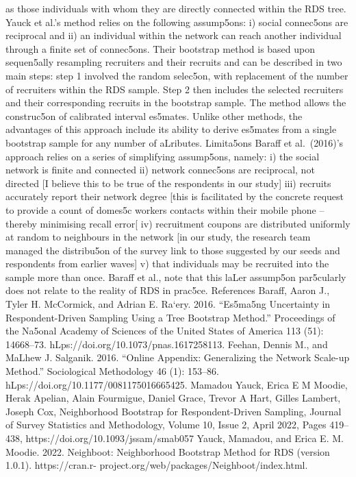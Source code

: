 \documentclass[
  12pt,
  letterpaper,
  DIV=11,
  numbers=noendperiod]{scrartcl}
\theoremstyle{plain}
\theoremstyle{definition}
\begin{document}
as those individuals with whom they are directly connected within the
RDS tree. Yauck et al.'s method relies on the following assump5ons: i)
social connec5ons are reciprocal and ii) an individual within the
network can reach another individual through a finite set of connec5ons.
Their bootstrap method is based upon sequen5ally resampling recruiters
and their recruits and can be described in two main steps: step 1
involved the random selec5on, with replacement of the number of
recruiters within the RDS sample. Step 2 then includes the selected
recruiters and their corresponding recruits in the bootstrap sample. The
method allows the construc5on of calibrated interval es5mates. Unlike
other methods, the advantages of this approach include its ability to
derive es5mates from a single bootstrap sample for any number of
aLributes. Limita5ons Baraﬀ et al.~(2016)'s approach relies on a series
of simplifying assump5ons, namely: i) the social network is finite and
connected ii) network connec5ons are reciprocal, not directed {[}I
believe this to be true of the respondents in our study{]} iii) recruits
accurately report their network degree {[}this is facilitated by the
concrete request to provide a count of domes5c workers contacts within
their mobile phone -- thereby minimising recall error{[} iv) recruitment
coupons are distributed uniformly at random to neighbours in the network
{[}in our study, the research team managed the distribu5on of the survey
link to those suggested by our seeds and respondents from earlier
waves{]} v) that individuals may be recruited into the sample more than
once. Baraﬀ et al., note that this laLer assump5on par5cularly does not
relate to the reality of RDS in prac5ce. References Baraﬀ, Aaron J.,
Tyler H. McCormick, and Adrian E. Ra`ery. 2016. ``Es5ma5ng Uncertainty
in Respondent-Driven Sampling Using a Tree Bootstrap Method.''
Proceedings of the Na5onal Academy of Sciences of the United States of
America 113 (51): 14668--73. hLps://doi.org/10.1073/pnas.1617258113.
Feehan, Dennis M., and MaLhew J. Salganik. 2016. ``Online Appendix:
Generalizing the Network Scale-up Method.'' Sociological Methodology 46
(1): 153--86. hLps://doi.org/10.1177/0081175016665425. Mamadou Yauck,
Erica E M Moodie, Herak Apelian, Alain Fourmigue, Daniel Grace, Trevor A
Hart, Gilles Lambert, Joseph Cox, Neighborhood Bootstrap for
Respondent-Driven Sampling, Journal of Survey Statistics and
Methodology, Volume 10, Issue 2, April 2022, Pages 419--438,
https://doi.org/10.1093/jssam/smab057 Yauck, Mamadou, and Erica E. M.
Moodie. 2022. Neighboot: Neighborhood Bootstrap Method for RDS (version
1.0.1). https://cran.r- project.org/web/packages/Neighboot/index.html.
\end{document}
